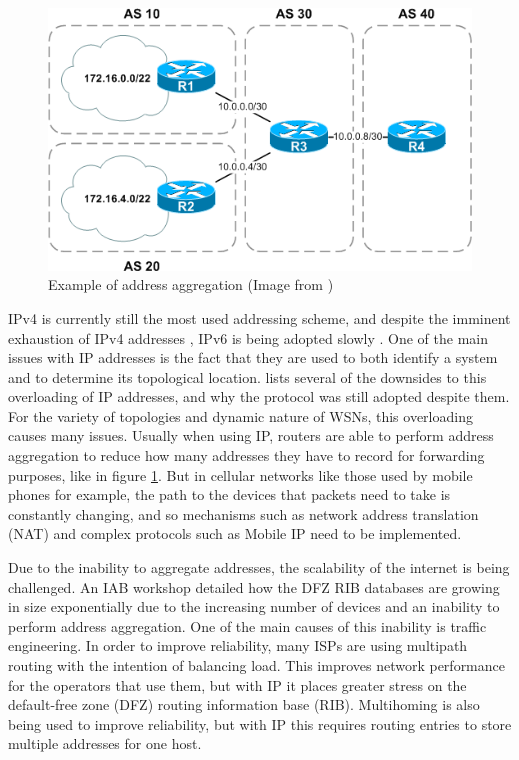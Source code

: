 \documentclass[12pt]{article}
\begin{document}
\begin{figure}[!ht]
	\centering
	\includegraphics[width=0.8 \linewidth]{images/agg}
	\caption{Example of address aggregation (Image from \cite{agg})}
	\label{fig:agg}
\end{figure}

IPv4 is currently still the most used addressing scheme, and despite the imminent exhaustion of IPv4 addresses \cite{ripe_labs}, IPv6 is being adopted slowly \cite{google_ipv6}. One of the main issues with IP addresses is the fact that they are used to both identify a system and to determine its topological location. \cite{briancarpenter2014} lists several of the downsides to this overloading of IP addresses, and why the protocol was still adopted despite them. 
For the variety of topologies and dynamic nature of WSNs, this overloading causes many issues. Usually when using IP, routers are able to perform address aggregation to reduce how many addresses they have to record for forwarding purposes, like in figure \ref{fig:agg}. But in cellular networks like those used by mobile phones for example, the path to the devices that packets need to take is constantly changing, and so mechanisms such as network address translation (NAT) and complex protocols such as Mobile IP need to be implemented. 

Due to the inability to aggregate addresses, the scalability of the internet is being challenged. An IAB workshop \cite{rfc4984} detailed how the DFZ RIB databases are growing in size exponentially due to the increasing number of devices and an inability to perform address aggregation. One of the main causes of this inability is traffic engineering. In order to improve reliability, many ISPs are using multipath routing with the intention of balancing load. This improves network performance for the operators that use them, but with IP it places greater stress on the default-free zone (DFZ) routing information base (RIB). Multihoming is also being used to improve reliability, but with IP this requires routing entries to store multiple addresses for one host. 
\end{document}
